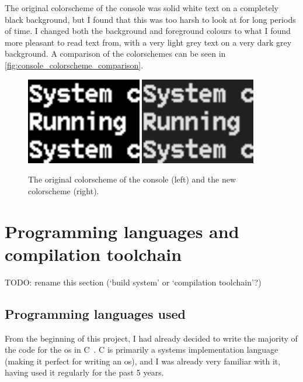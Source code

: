 \documentclass{article}
\begin{document}
The original colorscheme of the console was solid white text on a completely
black background, but I found that this was too harsh to look at for long
periods of time. I changed both the background and foreground colours to what I
found more pleasant to read text from, with a very light grey text on a very
dark grey background. A comparison of the colorschemes can be seen in
\autoref{fig:console_colorscheme_comparison}.

\begin{figure}[htpb]
    \centering
    \includegraphics[width=0.45\textwidth]{figure/black.png}
    \includegraphics[width=0.45\textwidth]{figure/grey.png}
    \caption{The original colorscheme of the console (left) and the new
    colorscheme (right).}
    \label{fig:console_colorscheme_comparison}
\end{figure}

\section{Programming languages and compilation toolchain}
TODO: rename this section (`build system' or `compilation toolchain'?)
\subsection{Programming languages used}
From the beginning of this project, I had already decided to write the majority
of the code for the \gls{os} in C~\cite{c-programming-language}. C is primarily
a systems implementation language (making it perfect for writing an \gls{os}),
and I was already very familiar with it, having used it regularly for the past
5 years.
\end{document}
